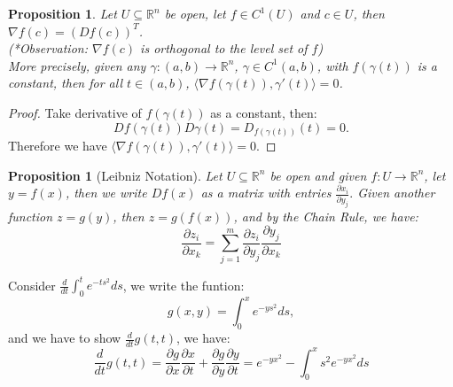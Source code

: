 \documentclass[11pt]{article}
\makeatletter
\newcounter{thmcounter}
\newenvironment{example}[1]{\begin{exbox}{#1}{}}{\end{exbox}}
\theoremstyle{quiet}
\newtheorem{proposition}[thmcounter]{Proposition}
\newtheorem{proposition}[tcb@cnt@defbox]{Proposition}
\theoremstyle{quietremark}
\makeatother
\begin{document}
\begin{proposition}
Let $U\subseteq\mathbb{R}^n$ be open, let $f\in C^1(U)$ and $c\in U$, then $\nabla f(c)=(Df(c))^T$.\\
(*Observation: $\nabla f(c)$ is orthogonal to the level set of $f$)\\
More precisely, given any $\gamma:(a,b)\to\mathbb{R}^n$, $\gamma\in C^1(a,b)$, with $f(\gamma(t))$ is a constant, then for all $t\in (a,b)$, $\langle \nabla f(\gamma(t)),\gamma'(t)\rangle=0$.
\end{proposition}

\begin{proof}
Take derivative of $f(\gamma(t))$ as a constant, then:
\[
Df(\gamma(t))D\gamma(t)=D_{f(\gamma(t))}(t)=0.
\]
Therefore we have $\langle\nabla f(\gamma(t)),\gamma'(t)\rangle=0$.
\end{proof}

\begin{proposition}[Leibniz Notation]
Let $U\subseteq\mathbb{R}^n$ be open and given $f:U\to\mathbb{R}^n$, let $y=f(x)$, then we write $Df(x)$ as a matrix with entries $\displaystyle\frac{\partial x_i}{\partial y_j}.$ Given another function $z=g(y)$, then $z=g(f(x))$, and by the Chain Rule, we have:
\[
\frac{\partial z_i}{\partial x_k}=\sum_{j=1}^m\frac{\partial z_i}{\partial y_j}\frac{\partial y_j}{\partial x_k}
\]
\end{proposition}

\begin{example}{}
Consider $\frac{d}{dt}\int_0^te^{-ts^2}ds$, we write the funtion:
\[
g(x,y)=\int_0^xe^{-ys^2}ds,
\]
and we have to show $\frac{d}{dt}g(t,t)$, we have:
\[
\frac{d}{dt}g(t,t)=\frac{\partial g}{\partial x}\frac{\partial x}{\partial t}+\frac{\partial g}{\partial y}\frac{\partial y}{\partial t}=e^{-yx^2}-\int_0^xs^2e^{-yx^2}ds
\]
\end{example}

\newpage
\end{document}
